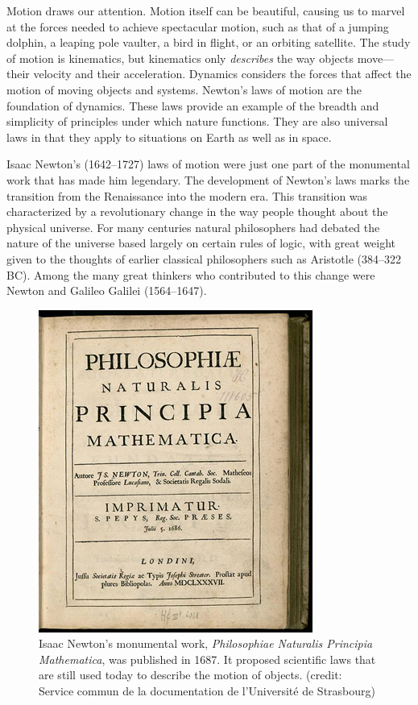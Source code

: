 \documentclass[
]{book}
\begin{document}
Motion draws our attention. Motion itself can be beautiful, causing us
to marvel at the forces needed to achieve spectacular motion, such as
that of a jumping dolphin, a leaping pole vaulter, a bird in flight, or
an orbiting satellite. The study of motion is kinematics, but kinematics
only \emph{describes} the way objects move---their velocity and their
acceleration. \protect\hypertarget{import-auto-id2665402}{}{Dynamics}\textbf{} considers the forces
that affect the motion of moving objects and systems. Newton's laws of
motion are the foundation of dynamics. These laws provide an example of
the breadth and simplicity of principles under which nature functions.
They are also universal laws in that they apply to situations on Earth
as well as in space.

Isaac Newton's (1642--1727) laws of motion were just one part of the
monumental work that has made him legendary. The development of Newton's
laws marks the transition from the Renaissance into the modern era. This
transition was characterized by a revolutionary change in the way people
thought about the physical universe. For many centuries natural
philosophers had debated the nature of the universe based largely on
certain rules of logic, with great weight given to the thoughts of
earlier classical philosophers such as Aristotle (384--322 BC). Among
the many great thinkers who contributed to this change were Newton and
Galileo Galilei (1564--1647).

\begin{figure}
\hypertarget{import-auto-id2054696}{%
\centering
\includegraphics{images/Figure_04_00_02.jpg}
\caption{Isaac Newton's monumental work, \emph{Philosophiae Naturalis Principia
Mathematica}, was published in 1687. It proposed scientific laws that
are still used today to describe the motion of objects. (credit: Service
commun de la documentation de l'Université de
Strasbourg)}\label{import-auto-id2054696}
}
\end{figure}
\end{document}
